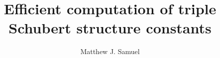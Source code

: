 \documentclass{amsart}
\title{Efficient computation of triple Schubert structure constants}
\author{Matthew J. Samuel}
\theoremstyle{definition}
\theoremstyle{remark}
\numberwithin{equation}{section}
\DeclareMathOperator{\sch}{\mathfrak{S}}
\begin{document}
\begin{abstract}

\end{abstract}
\end{document}
